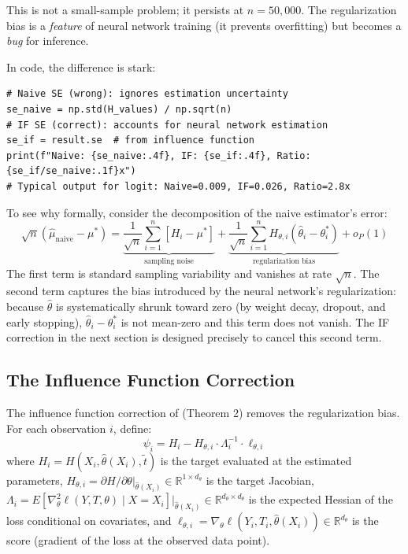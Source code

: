 \noindent This is not a small-sample problem; it persists at $n = 50{,}000$. The regularization bias is a \emph{feature} of neural network training (it prevents overfitting) but becomes a \emph{bug} for inference.

In code, the difference is stark:

\begin{lstlisting}
# Naive SE (wrong): ignores estimation uncertainty
se_naive = np.std(H_values) / np.sqrt(n)
# IF SE (correct): accounts for neural network estimation
se_if = result.se  # from influence function
print(f"Naive: {se_naive:.4f}, IF: {se_if:.4f}, Ratio: {se_if/se_naive:.1f}x")
# Typical output for logit: Naive=0.009, IF=0.026, Ratio=2.8x
\end{lstlisting}

\noindent To see why formally, consider the decomposition of the naive estimator's error:
\begin{equation}\label{eq:bias_decomp}
    \sqrt{n}\!\left(\hat{\mu}_{\text{naive}} - \mu^*\right) = \underbrace{\frac{1}{\sqrt{n}}\sum_{i=1}^n \left[H_i - \mu^*\right]}_{\text{sampling noise}} + \underbrace{\frac{1}{\sqrt{n}}\sum_{i=1}^n H_{\theta,i}\!\left(\hat{\theta}_i - \theta^*_i\right)}_{\text{regularization bias}} + o_P(1)
\end{equation}
The first term is standard sampling variability and vanishes at rate $\sqrt{n}$. The second term captures the bias introduced by the neural network's regularization: because $\hat{\theta}$ is systematically shrunk toward zero (by weight decay, dropout, and early stopping), $\hat{\theta}_i - \theta^*_i$ is not mean-zero and this term does not vanish. The IF correction in the next section is designed precisely to cancel this second term.

\subsection{The Influence Function Correction}\label{sec:if_correction}

The influence function correction of \citet{farrell2025deep} (Theorem 2) removes the regularization bias. For each observation $i$, define:
\begin{equation}\label{eq:psi}
    \psi_i = H_i - H_{\theta,i} \cdot \Lambda_i^{-1} \cdot \ell_{\theta,i}
\end{equation}
where $H_i = H(X_i, \hat{\theta}(X_i), \tilde{t})$ is the target evaluated at the estimated parameters, $H_{\theta,i} = \partial H / \partial \theta |_{\hat{\theta}(X_i)} \in \mathbb{R}^{1 \times d_\theta}$ is the target Jacobian, $\Lambda_i = E[\nabla_\theta^2 \ell(Y, T, \theta) \mid X = X_i]|_{\hat{\theta}(X_i)} \in \mathbb{R}^{d_\theta \times d_\theta}$ is the expected Hessian of the loss conditional on covariates, and $\ell_{\theta,i} = \nabla_\theta \ell(Y_i, T_i, \hat{\theta}(X_i)) \in \mathbb{R}^{d_\theta}$ is the score (gradient of the loss at the observed data point).

